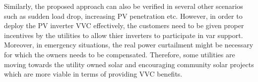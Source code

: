 \documentclass[journal]{IEEEtran}
\begin{document}


Similarly, the proposed approach can also be verified in several other scenarios such as sudden load drop, increasing PV penetration etc. {However, in order to deploy the PV inverter VVC effectively, the customers need to be given proper incentives by the utilities to allow thier inverters to participate in var support. Moreover, in emergency situations, the real power curtailment might be necessary for which the owners needs to be compensated. Therefore, some utilities are moving towards the utility owned solar and encouraging community solar projects which are more viable in terms of providing VVC benefits.}

\vspace{-1em}
\end{document}
